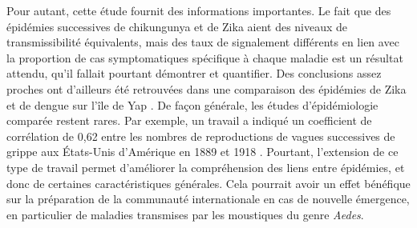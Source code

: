 Pour autant, cette étude fournit des informations importantes.
Le fait que des épidémies successives de chikungunya et de Zika aient des niveaux de transmissibilité équivalents, mais des taux de signalement différents en lien avec la proportion de cas symptomatiques spécifique à chaque maladie est un résultat attendu, qu'il fallait pourtant démontrer et quantifier.
Des conclusions assez proches ont d'ailleurs été retrouvées dans une comparaison des épidémies de Zika et de dengue sur l'île de Yap \cite{funk2016comparative}.
De façon générale, les études d'épidémiologie comparée restent rares.
Par exemple, un travail a indiqué un coefficient de corrélation de 0,62 entre les nombres de reproductions de vagues successives de grippe aux \'Etats-Unis d'Amérique en 1889 et 1918 \cite{valleron2010transmissibility}.
Pourtant, l'extension de ce type de travail permet d'améliorer la compréhension des liens entre épidémies, et donc de certaines caractéristiques générales.
Cela pourrait avoir un effet bénéfique sur la préparation de la communauté internationale en cas de nouvelle émergence, en particulier de maladies transmises par les moustiques du genre {\em Aedes}.